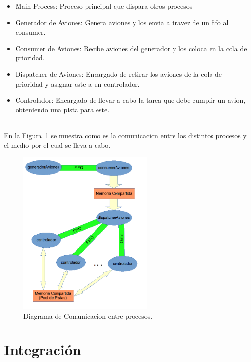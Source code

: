 \documentclass[a4paper,12pt,titlepage]{article}
\begin{document}
\begin{itemize}
\item Main Process: Proceso principal que dispara otros procesos.
\item Generador de Aviones: Genera aviones y los envia a travez de un fifo al consumer.
\item Consumer de Aviones: Recibe aviones del generador y los coloca en la cola de prioridad.
\item Dispatcher de Aviones: Encargado de retirar los aviones de la cola de prioridad y asignar este a un controlador.
\item Controlador: Encargado de llevar a cabo la tarea que debe cumplir un avion, obteniendo una pista para este.
\end{itemize}
\\

En la Figura~\ref{fig:dia_comunicacion_procesos} se muestra como es la comunicacion entre los distintos procesos y el medio por el cual se lleva a cabo.

\begin{figure}
  \centering
    \includegraphics[width=0.6\textwidth] {comunicacion_procesos}
  \caption{Diagrama de Comunicacion entre procesos.}
  \label{fig:dia_comunicacion_procesos}
\end{figure}



\newpage
\section{Integración}
\end{document}
